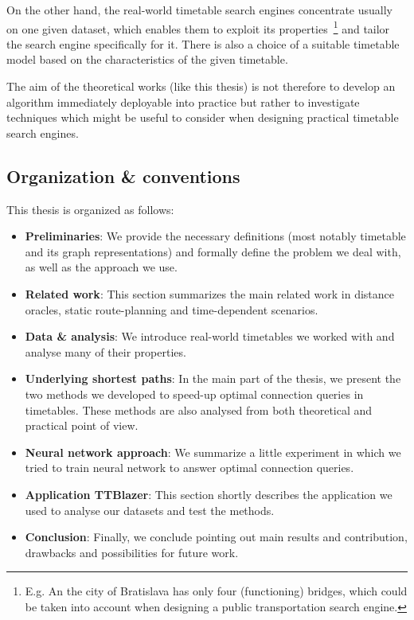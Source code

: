 	On the other hand, the real-world timetable search engines concentrate usually on one given dataset, which enables them to exploit its properties~\footnote{E.g. An the city of Bratislava has only four (functioning) bridges, which could be taken into account when designing a public transportation search engine.} and tailor the search engine specifically for it. There is also a choice of a suitable timetable model based on the characteristics of the given timetable.
	
	The aim of the theoretical works (like this thesis) is not therefore to develop an algorithm immediately deployable into practice but rather to investigate techniques which might be useful to consider when designing practical timetable search engines.
	
\subsection{Organization \& conventions}

	\noindent This thesis is organized as follows: 
	\begin{itemize}
		\item \textbf{Preliminaries}: We provide the necessary definitions (most notably timetable and its graph representations) and formally define the problem we deal with, as well as the approach we use.
		\item \textbf{Related work}: This section summarizes the main related work in distance oracles, static route-planning and time-dependent scenarios.
		\item \textbf{Data \& analysis}: We introduce real-world timetables we worked with and analyse many of their properties.
		\item \textbf{Underlying shortest paths}: In the main part of the thesis, we present the two methods we developed to speed-up optimal connection queries in timetables. These methods are also analysed from both theoretical and practical point of view.
		\item \textbf{Neural network approach}: We summarize a little experiment in which we tried to train neural network to answer optimal connection queries.
		\item \textbf{Application TTBlazer}: This section shortly describes the application we used to analyse our datasets and test the methods.
		\item \textbf{Conclusion}: Finally, we conclude pointing out main results and contribution, drawbacks and possibilities for future work.
	\end{itemize}